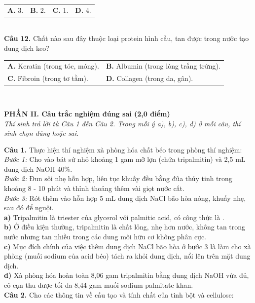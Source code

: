 \documentclass[11pt,a4paper]{article}
\begin{document}
\begin{tabularx}{\textwidth}{@{}XXXX@{}}\textbf{A.} 3. & \textbf{B.} 2. & \textbf{C.} 1. & \textbf{D.} 4.\end{tabularx}\\[2pt]
\vspace{2pt}
\textbf{Câu 12.} Chất nào sau đây thuộc loại protein hình cầu, tan được trong nước tạo dung dịch keo?\\[2pt]
\begin{tabularx}{\textwidth}{@{}XX@{}}\textbf{A.} Keratin (trong tóc, móng). & \textbf{B.} Albumin (trong lòng trắng trứng). \\ \textbf{C.} Fibroin (trong tơ tằm). & \textbf{D.} Collagen (trong da, gân).\end{tabularx}\\[2pt]
\vspace{2pt}

\vspace{4pt}
\noindent\textbf{\large\color{mainGreen}PHẦN II. Câu trắc nghiệm đúng sai (2,0 điểm)}\\
\textit{Thí sinh trả lời từ Câu 1 đến Câu 2. Trong mỗi ý a), b), c), d) ở mỗi câu, thí sinh chọn đúng hoặc sai.}
\vspace{4pt}


\textbf{Câu 1.} Thực hiện thí nghiệm xà phòng hóa chất béo trong phòng thí nghiệm:\\
\textit{Bước 1:} Cho vào bát sứ nhỏ khoảng 1 gam mỡ lợn (chứa tripalmitin) và 2,5 mL dung dịch NaOH 40\%.\\
\textit{Bước 2:} Đun sôi nhẹ hỗn hợp, liên tục khuấy đều bằng đũa thủy tinh trong khoảng 8 - 10 phút và thỉnh thoảng thêm vài giọt nước cất.\\
\textit{Bước 3:} Rót thêm vào hỗn hợp 5 mL dung dịch NaCl bão hòa nóng, khuấy nhẹ, sau đó để nguội.\\[2pt]

\quad \textbf{a)} Tripalmitin là triester của glycerol với palmitic acid, có công thức là .\\[2pt]
\quad \textbf{b)} Ở điều kiện thường, tripalmitin là chất lỏng, nhẹ hơn nước, không tan trong nước nhưng tan nhiều trong các dung môi hữu cơ không phân cực.\\[2pt]
\quad \textbf{c)} Mục đích chính của việc thêm dung dịch NaCl bão hòa ở bước 3 là làm cho xà phòng (muối sodium của acid béo) tách ra khỏi dung dịch, nổi lên trên mặt dung dịch.\\[2pt]
\quad \textbf{d)} Xà phòng hóa hoàn toàn 8,06 gam tripalmitin bằng dung dịch NaOH vừa đủ, cô cạn thu được tối đa 8,44 gam muối sodium palmitate khan.\\[2pt]
\vspace{4pt}
\textbf{Câu 2.} Cho các thông tin về cấu tạo và tính chất của tinh bột và cellulose:\\[2pt]
\end{document}
